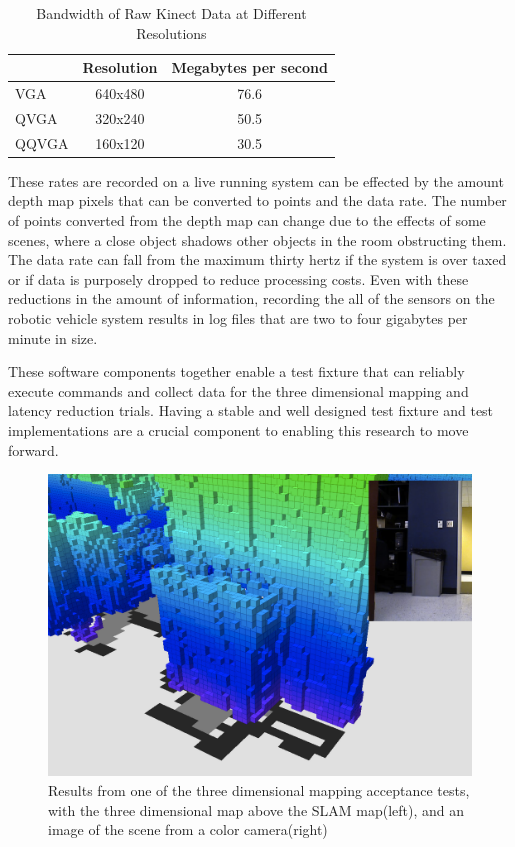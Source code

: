 \documentclass[12pt]{report}
\begin{document}
\begin{table}
\caption{Bandwidth of Raw Kinect Data at Different Resolutions}
\label{tab:kinect_data}
\begin{center}
  \begin{tabular}{ | l | c | c | }
    \hline
    ~ & Resolution & Megabytes per second \\
    \hline
    VGA & 640x480 & 76.6 \\
    QVGA & 320x240 & 50.5 \\
    QQVGA & 160x120 & 30.5 \\
    \hline
  \end{tabular}
\end{center}
\end{table}

These rates are recorded on a live running system can be effected by the amount depth map pixels that can be converted to points and the data rate.  The number of points converted from the depth map can change due to the effects of some scenes, where a close object shadows other objects in the room obstructing them.  The data rate can fall from the maximum thirty hertz if the system is over taxed or if data is purposely dropped to reduce processing costs.  Even with these reductions in the amount of information, recording the all of the sensors on the robotic vehicle system results in log files that are two to four gigabytes per minute in size.

These software components together enable a test fixture that can reliably execute commands and collect data for the three dimensional mapping and latency reduction trials.  Having a stable and well designed test fixture and test implementations are a crucial component to enabling this research to move forward.

\begin{figure}[ht]
  \centering
  \includegraphics[width=6.5in,keepaspectratio]{mapping_trashcan.png}
  \caption{Results from one of the three dimensional mapping acceptance tests, with the three dimensional map above the SLAM map(left), and an image of the scene from a color camera(right)}
  \label{fig:mapping_trashcan}
\end{figure}
\end{document}
